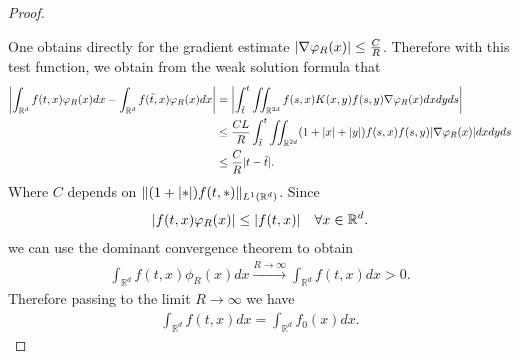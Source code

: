 \begin{proof}
\begin{figure}[H]
\begin{center}
   \end{center}
 \end{figure}
 One obtains directly for the gradient estimate $\abs{\nabla \phi_R(x)} \le  \frac{C}{R}$. Therefore with this
 test function, we obtain from the weak solution formula that 
 \begin{align*}
   \abs*{\int_{\mathbb{R}^{d} }f(t,x)\phi_R(x)dx - \int_{\mathbb{R}^{d} } f(\tilde{t},x )\phi_R(x) dx} &= \abs*{\int_{\tilde{t} }^{t}\iint_{\mathbb{R}^{2d} }f(s,x)K(x,y)f(s,y)\nabla \phi_R(x)dxdyds }\\
                                                                                                       &\le \frac{CL}{R}  \int_{\tilde{t} }^{t}\iint_{\mathbb{R}^{2d} } (1+\abs{x} + \abs{y})f(s,x)f(s,y) \abs{\nabla \phi_R(x)} dx dy ds \\
                                                                                                       &\le  \frac{C}{R}\abs{t - \tilde{t}}
 .\end{align*}
 Where $C$ depends on $\|(1+\abs{*})f(t,*)\|_{L^{1}(\mathbb{R}^{d} ) }$. Since 
 \begin{align*}
  \abs{f(t,x)\phi_R(x)}\le \abs{f(t,x)} \quad \forall  x \in  \mathbb{R}^{d} 
 .\end{align*}
 we can use the dominant convergence theorem to obtain 
 \begin{align*}
   \int_{\mathbb{R}^{d} } f(t,x)\phi_R(x) dx \xrightarrow{R\to \infty} \int_{\mathbb{R}^{d} }f(t,x) dx >0
 .\end{align*}
 Therefore passing to the limit $R \to \infty$ we have 
 \begin{align*}
   \int_{\mathbb{R}^{d} } f(t,x) dx = \int_{\mathbb{R}^{d} }f_0(x) dx
 .\end{align*}
\end{proof}
